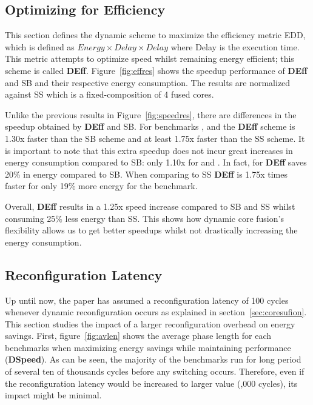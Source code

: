 \subsection{Optimizing for Efficiency}

This section defines the dynamic scheme to maximize the efficiency metric EDD, which is defined as $Energy \times Delay \times Delay$ where Delay is the execution time.
This metric attempts to optimize speed whilst remaining energy efficient; this scheme is called \textbf{DEff}.
Figure~\ref{fig:effres} shows the speedup performance of \textbf{DEff} and SB and their respective energy consumption.
The results are normalized against SS which is a fixed-composition of 4 fused cores.

Unlike the previous results in Figure~\ref{fig:speedres}, there are differences in the speedup obtained by \textbf{DEff} and SB.
For benchmarks ,  and  the \textbf{DEff} scheme is 1.30x faster than the SB scheme and at least 1.75x faster than the SS scheme.
It is important to note that this extra speedup does not incur great increases in energy consumption compared to SB: only 1.10x for  and .
In fact, for  \textbf{DEff} saves 20\% in energy compared to SB.
When comparing to SS \textbf{DEff} is 1.75x times faster for only 19\% more energy for the  benchmark.

Overall, \textbf{DEff} results in a 1.25x speed increase compared to SB and SS whilst consuming 25\% less energy than SS.
This shows how dynamic core fusion's flexibility allows us to get better speedups whilst not drastically increasing the energy consumption.




\subsection{Reconfiguration Latency} \label{sec:reconfoverhead}

Up until now, the paper has assumed a reconfiguration latency of 100 cycles whenever dynamic reconfiguration occurs as explained in section~\ref{sec:coresufion}.
This section studies the impact of a larger reconfiguration overhead on energy savings.
First, figure~\ref{fig:avlen} shows the average phase length for each benchmarks when maximizing energy savings while maintaining performance (\textbf{DSpeed}).
As can be seen, the majority of the benchmarks run for long period of several ten of thousands cycles before any switching occurs.
Therefore, even if the reconfiguration latency would be increased to larger value (,000 cycles), its impact might be minimal.

